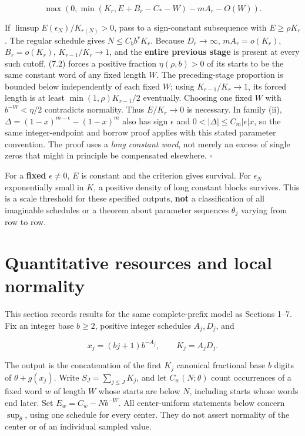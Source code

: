 \documentclass[11pt,a4paper]{article}
\begin{document}
\[
\max(0, \min(K_r,E+B_r-C_{\ast}-W)-m A_r-O(W)).\tag{7.2}
\]

If \(\limsup E(\epsilon_N)/K_{r(N)}>0\), pass to a sign-constant
subsequence with \(E\ge \rho K_r\). The regular schedule gives
\(N\le C_b b^r K_r\). Because \(D_r\to \infty\), \(m A_r=o(K_r)\),
\(B_r=o(K_r)\), \(K_{r-1}/K_r\to 1\), and the \textbf{entire previous
stage} is present at every such cutoff, (7.2) forces a positive fraction
\(\eta(\rho,b)>0\) of its starts to be the same constant word of any
fixed length \(W\). The preceding-stage proportion is bounded below
independently of each fixed \(W\); using \(K_{r-1}/K_r\to 1\), its
forced length is at least \(\min(1,\rho)K_{r-1}/2\) eventually. Choosing
one fixed \(W\) with \(b^{-W}< \eta/2\) contradicts normality. Thus
\(E/K_r\to 0\) is necessary. In family (ii),
\(\Delta=(1-x)^{m-\epsilon}-(1-x)^m\) also has sign \(\epsilon\) and
\(0< |\Delta|\le C_m|\epsilon|x\), so the same integer-endpoint and
borrow proof applies with this stated parameter convention. The proof
uses a \emph{long constant word}, not merely an excess of single zeros
that might in principle be compensated elsewhere. \(\square\)

For a \textbf{fixed} \(\epsilon\ne 0\), \(E\) is constant and the
criterion gives survival. For \(\epsilon_N\) exponentially small in
\(K\), a positive density of long constant blocks survives. This is a
scale threshold for these specified outputs, \textbf{not} a
classification of all imaginable schedules or a theorem about parameter
sequences \(\theta_j\) varying from row to row.

\section{Quantitative resources and local
normality}\label{quantitative-resources-and-local-normality}

This section records results for the same complete-prefix model as
Sections 1--7. Fix an integer base \(b\ge2\), positive integer schedules
\(A_j,D_j\), and

\[
x_j=(bj+1)b^{-A_j},\qquad K_j=A_jD_j.
\]

The output is the concatenation of the first \(K_j\) canonical
fractional base \(b\) digits of \(\theta+g(x_j)\). Write
\(S_J=\sum_{j\le J}K_j\), and let \(C_w(N;\theta)\) count occurrences of
a fixed word \(w\) of length \(W\) whose starts are below \(N\),
including starts whose words end later. Set \(E_w=C_w-Nb^{-W}\). All
center-uniform statements below concern \(\sup_\theta\), using one
schedule for every center. They do not assert normality of the center or
of an individual sampled value.
\end{document}
